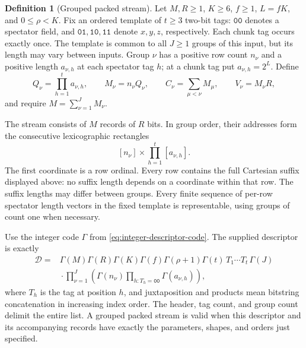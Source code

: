 \documentclass[11pt]{article}
\theoremstyle{definition}
\newtheorem{definition}[theorem]{Definition}
\begin{document}
\begin{definition}[Grouped packed stream]
\label{def:grouped-packed-stream}
Let $M,R\ge1$, $K\ge6$, $f\ge1$, $L=fK$, and $0\le\rho<K$.
Fix an ordered template of $t\ge3$ two-bit tags: $\mathtt{00}$ denotes
a spectator field, and $\mathtt{01},\mathtt{10},\mathtt{11}$ denote
$x,y,z$, respectively. Each chunk tag occurs exactly once. The template
is common to all $J\ge1$ groups of this input, but its length may vary
between inputs. Group $\nu$ has a positive row count $n_\nu$ and a
positive length $a_{\nu,h}$ at each spectator tag $h$; at a chunk tag
put $a_{\nu,h}=2^L$. Define
\[
 Q_\nu=\prod_{h=1}^t a_{\nu,h},\qquad
 M_\nu=n_\nu Q_\nu,\qquad
 C_\nu=\sum_{\mu<\nu}M_\mu,\qquad V_\nu=M_\nu R,
\]
and require $M=\sum_{\nu=1}^J M_\nu$.

The stream consists of $M$ records of $R$ bits. In group order, their
addresses form the consecutive lexicographic rectangles
\[
 [n_\nu]\times\prod_{h=1}^t[a_{\nu,h}].
\]
The first coordinate is a row ordinal. Every row contains the full
Cartesian suffix displayed above: no suffix length depends on a
coordinate within that row. The suffix lengths may differ between
groups. Every finite sequence of per-row spectator length vectors in
the fixed template is representable, using groups of count one when
necessary.

Use the integer code $\Gamma$ from \eqref{eq:integer-descriptor-code}.
The supplied descriptor
is exactly
\[
\begin{split}
 \mathcal D={}&
 \Gamma(M)\Gamma(R)\Gamma(K)\Gamma(f)\Gamma(\rho+1)\Gamma(t)\,
 T_1\cdots T_t\,\Gamma(J)\\
 &{}\cdot\prod_{\nu=1}^{J}
 \left(\Gamma(n_\nu)
       \prod_{h:T_h=\mathtt{00}}\Gamma(a_{\nu,h})\right),
\end{split}
\]
where $T_h$ is the tag at position $h$, and juxtaposition and products
mean bitstring concatenation in increasing index order. The header,
tag count, and group count delimit the entire list. A grouped packed
stream is valid when this descriptor and its accompanying records have
exactly the parameters, shapes, and orders just specified.
\end{definition}
\end{document}
